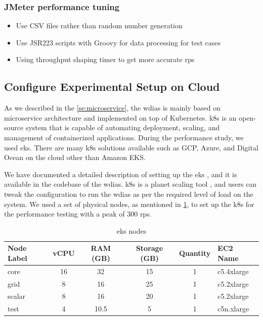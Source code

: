 \subsubsection{JMeter performance tuning}
\begin{itemize}
    \item Use CSV files rather than random number generation
    \item Use JSR223 scripts with Groovy for data processing for test cases
    \item Using throughput shaping timer to get more accurate \acrshort{rps}
\end{itemize}


\subsection{Configure Experimental Setup on Cloud}
\label{subse:test_sys_config}
As we described in the \cref{se:microservice}, the \acrshort{wdias} is mainly based on microservice architecture and implemented on top of Kubernetes. \acrfull{k8s} is an open-source system that is capable of automating deployment, scaling, and management of containerized applications. During the performance study, we used \acrfull{eks}. There are many \acrshort{k8s} solutions available such as GCP, Azure, and Digital Ocean on the cloud other than Amazon EKS.

We have documented a detailed description of setting up the \acrshort{eks} \cite{KarunarathneWdias/Amazon_EKS.md:EKS}, and it is available in the codebase of the \acrshort{wdias}. \acrshort{k8s} is a planet scaling tool \cite{LinuxFoundationProduction-GradeKubernetes}, and users can tweak the configuration to run the \acrshort{wdias} as per the required level of load on the system. We used a set of physical nodes, as mentioned in \cref{tab:aws_eks_nodes}, to set up the \acrshort{k8s} for the performance testing with a peak of 300 \acrshort{rps}.

\begin{table}[ht]
\centering
\caption{\acrshort{eks} nodes}
\footnotesize
\begin{tabular}{|l|c|c|c|c|l|}
\hline
\textbf{Node Label} & \textbf{vCPU} & \textbf{RAM (GB)} & \textbf{Storage (GB)} & \textbf{Quantity} & \textbf{EC2 Name} \\ \hline
core & 16 & 32 & 15 & 1 & c5.4xlarge \\ \hline
grid & 8 & 16 & 25 & 1 & c5.2xlarge \\ \hline
scalar & 8 & 16 & 20 & 1 & c5.2xlarge \\ \hline
test & 4 & 10.5 & 5 & 1 & c5n.xlarge \\ \hline
\end{tabular}
\label{tab:aws_eks_nodes}
\end{table}

